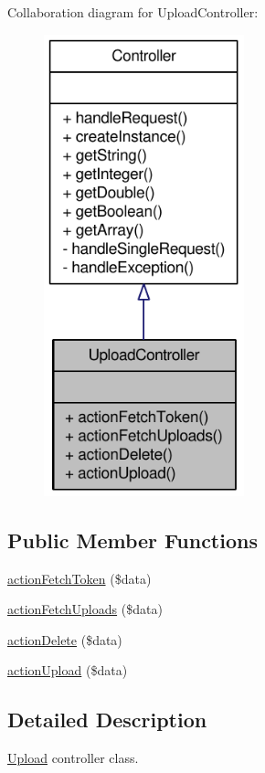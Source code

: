 Collaboration diagram for UploadController:\nopagebreak
\begin{figure}[H]
\begin{center}
\leavevmode
\includegraphics[width=164pt]{classUploadController__coll__graph}
\end{center}
\end{figure}
\subsection*{Public Member Functions}
\begin{DoxyCompactItemize}
\item 
\hyperlink{classUploadController_a4fa1e1e4e97f965fdcd852b0d53721bb}{actionFetchToken} (\$data)
\item 
\hyperlink{classUploadController_a65ec284e6637e13969f2c86ca17577d4}{actionFetchUploads} (\$data)
\item 
\hyperlink{classUploadController_a107d052c524ffab7de8adb67f296a5f9}{actionDelete} (\$data)
\item 
\hyperlink{classUploadController_a24a9ee619055e570ba66193ec2b378b1}{actionUpload} (\$data)
\end{DoxyCompactItemize}


\subsection{Detailed Description}
\hyperlink{classUpload}{Upload} controller class. 

